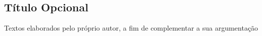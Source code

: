 \begin{apendicesenv}
\chapter{Título Opcional}
Textos elaborados pelo próprio autor, a fim de complementar a sua argumentação
\end{apendicesenv}
